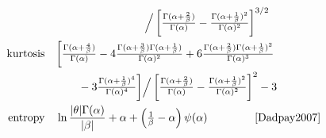 \begin{table*}[pt!]
\begin{align*}
 \hspace{-3em}
 \\ & \qquad \qquad \qquad \qquad \Big /
 \left[  \tfrac{\Gamma(\alpha+\frac{2}{\beta})}{\Gamma(\alpha)}  - 
\tfrac{\Gamma(\alpha+\frac{1}{\beta})^2}{\Gamma(\alpha)^2}    \right]^{3/2}
\hspace{-3em}
\\
\text{kurtosis} \quad  &  
 \bigg[  \tfrac{\Gamma(\alpha+\frac{4}{\beta})}{\Gamma(\alpha)} 
 - 4 \tfrac{\Gamma(\alpha+\frac{3}{\beta})\Gamma(\alpha+\frac{1}{\beta})}{\Gamma(\alpha)^2}    
 + 6 \tfrac{\Gamma(\alpha+\frac{2}{\beta})\Gamma(\alpha+\frac{1}{\beta})^2}{\Gamma(\alpha)^3}    
\hspace{-3em}
 \\ & \qquad 
 -3  \tfrac{\Gamma(\alpha+\frac{1}{\beta})^4}{\Gamma(\alpha)^4}   \bigg]
 \Big /
 \left[  \tfrac{\Gamma(\alpha+\frac{2}{\beta})}{\Gamma(\alpha)}  - 
\tfrac{\Gamma(\alpha+\frac{1}{\beta})^2}{\Gamma(\alpha)^2}    \right]^{2}
-3 
\hspace{-3em}
\\
\text{entropy} \quad& 
\ln \frac{|\theta| \Gamma(\alpha)}{|\beta|} +\alpha + \left( \sfrac{1}{\beta} - \alpha\right) \psi(\alpha) \checked &
\text{\cite{Dadpay2007}}
\end{align*}
\end{table*}


